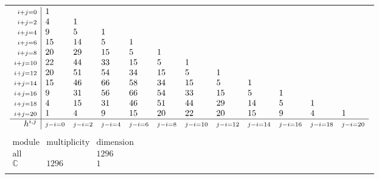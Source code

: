 \documentclass[crop,border=2mm]{standalone}
\begin{document}
\begin{tabular}{l}
$\displaystyle
\begin{array}{r|l l l l l l l l l l l}
	{\scriptstyle i+j=0}&1&&&&&&&&&&\\
	{\scriptstyle i+j=2}&4&1&&&&&&&&&\\
	{\scriptstyle i+j=4}&9&5&1&&&&&&&&\\
	{\scriptstyle i+j=6}&15&14&5&1&&&&&&&\\
	{\scriptstyle i+j=8}&20&29&15&5&1&&&&&&\\
	{\scriptstyle i+j=10}&22&44&33&15&5&1&&&&&\\
	{\scriptstyle i+j=12}&20&51&54&34&15&5&1&&&&\\
	{\scriptstyle i+j=14}&15&46&66&58&34&15&5&1&&&\\
	{\scriptstyle i+j=16}&9&31&56&66&54&33&15&5&1&&\\
	{\scriptstyle i+j=18}&4&15&31&46&51&44&29&14&5&1&\\
	{\scriptstyle i+j=20}&1&4&9&15&20&22&20&15&9&4&1\\
	\hline h^{i,j}&{\scriptstyle j-i=0}&{\scriptstyle j-i=2}&{\scriptstyle j-i=4}&{\scriptstyle j-i=6}&{\scriptstyle j-i=8}&{\scriptstyle j-i=10}&{\scriptstyle j-i=12}&{\scriptstyle j-i=14}&{\scriptstyle j-i=16}&{\scriptstyle j-i=18}&{\scriptstyle j-i=20}
\end{array}
$ \\ \\


$\displaystyle
\begin{array}{rll}
	\text{module}&\text{multiplicity}&\text{dimension} \\ \hline \text{all}&&1296 \\
	\mathbb{C}&1296&1
\end{array}
$ \\ \\

\end{tabular}
\end{document}
